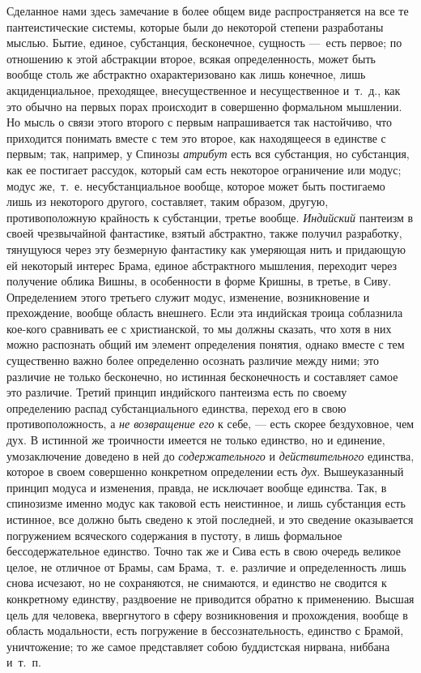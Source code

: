 Сделанное нами здесь замечание в более общем виде распространяется на все те
пантеистические системы, которые были до некоторой степени разработаны
мыслью. Бытие, единое, субстанция, бесконечное, сущность —~есть первое; по
отношению к этой абстракции второе, всякая определенность, может быть
вообще столь же абстрактно охарактеризовано как лишь конечное, лишь
акциденциальное, преходящее, внесущественное и несущественное и~т.~д., как
это обычно на первых порах происходит в совершенно формальном мышлении. Но
мысль о связи этого второго с первым напрашивается так настойчиво, что
приходится понимать вместе с тем это второе, как находящееся в единстве с
первым; так, например, у Спинозы {\em атрибут} есть вся
субстанция, но субстанция, как ее постигает рассудок, который сам есть
некоторое ограничение или модус; модус же,~т.~е. несубстанциальное вообще,
которое может быть постигаемо лишь из некоторого другого, составляет, таким
образом, другую, противоположную крайность к субстанции, третье вообще.
{\em Индийский} пантеизм в своей чрезвычайной
фантастике, взятый абстрактно, также получил разработку, тянущуюся через
эту безмерную фантастику как умеряющая нить и придающую ей некоторый
интерес Брама, единое абстрактного мышления, переходит через получение
облика Вишны, в особенности в форме Кришны, в третье, в Сиву. Определением
этого третьего служит модус, изменение, возникновение и прехождение, вообще
область внешнего. Если эта индийская троица соблазнила кое-кого сравнивать
ее с христианской, то мы должны сказать, что хотя в них можно распознать
общий им элемент определения понятия, однако вместе с тем существенно важно
более определенно осознать различие между ними; это различие не только
бесконечно, но истинная бесконечность и составляет самое это различие.
Третий принцип индийского пантеизма есть по своему определению распад
субстанциального единства, переход его в свою противоположность, а
{\em не возвращение его} к себе, — есть скорее
бездуховное, чем дух. В истинной же троичности имеется не только единство,
но и единение, умозаключение доведено в ней до
{\em содержательного} и
{\em действительного} единства, которое в своем
совершенно конкретном определении есть {\em дух}.
Вышеуказанный принцип модуса и изменения, правда, не исключает вообще
единства. Так, в спинозизме именно модус как таковой есть неистинное, и
лишь субстанция есть истинное, все должно быть сведено к этой последней, и
это сведение оказывается погружением всяческого содержания в пустоту, в
лишь формальное бессодержательное единство. Точно так же и Сива есть в свою
очередь великое целое, не отличное от Брамы, сам Брама,~т.~е. различие и
определенность лишь снова исчезают, но не сохраняются, не снимаются, и
единство не сводится к конкретному единству, раздвоение не приводится
обратно к применению. Высшая цель для человека, ввергнутого в сферу
возникновения и прохождения, вообще в область модальности, есть погружение
в бессознательность, единство с Брамой, уничтожение; то же самое
представляет собою буддистская нирвана, ниббана и~т.~п.


